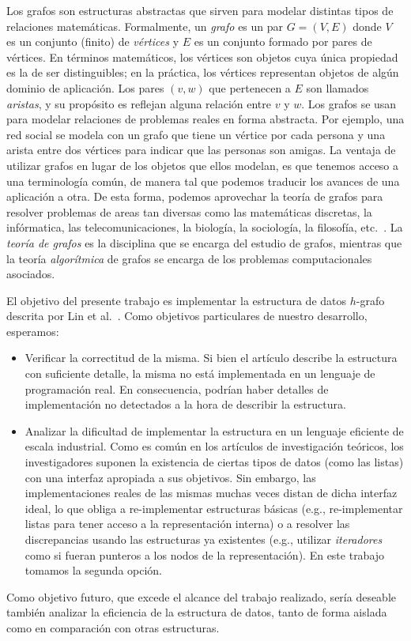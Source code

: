 \documentclass[%
    a4paper,%
    fontsize=12pt,%
    DIV=12,
    twoside,%
    openright,%
    titlepage=true,%
    headsepline,%
    toc=bibliography,%
    parskip=half,%
    cleardoublepage=empty,%
    headings=big,%
]{scrbook}
\begin{document}
Los grafos son estructuras abstractas que sirven para modelar distintas tipos de relaciones matemáticas.  Formalmente, un \emph{grafo} es un par $G = (V, E)$ donde $V$ es un conjunto (finito) de \emph{vértices} y $E$ es un conjunto formado por pares de vértices.  En términos matemáticos, los vértices son objetos cuya única propiedad es la de ser distinguibles; en la práctica, los vértices representan objetos de algún dominio de aplicación.  Los pares $(v,w)$ que pertenecen a $E$ son llamados \emph{aristas}, y su propósito es reflejan alguna relación entre $v$ y $w$.  Los grafos se usan para modelar relaciones de problemas reales en forma abstracta.  Por ejemplo, una red social se modela con un grafo que tiene un vértice por cada persona y una arista entre dos vértices para indicar que las personas son amigas.  La ventaja de utilizar grafos en lugar de los objetos que ellos modelan, es que tenemos acceso a una terminología común, de manera tal que podemos traducir los avances de una aplicación a otra.  De esta forma, podemos aprovechar la teoría de grafos para resolver problemas de areas tan diversas como las matemáticas discretas, la infórmatica, las telecomunicaciones, la biología, la sociología, la filosofía, etc.~\cite{GrossYellen2006}.  La \emph{teoría de grafos} es la disciplina que se encarga del estudio de grafos, mientras que la teoría \emph{algorítmica} de grafos se encarga de los problemas computacionales asociados.

El objetivo del presente trabajo es implementar la estructura de datos $h$-grafo descrita por Lin et al.~\cite{LinSoulignacSzwarcfiterTCS2012}.   Como objetivos particulares de nuestro desarrollo, esperamos:
\begin{itemize}
  \item Verificar la correctitud de la misma.  Si bien el artículo describe la estructura con suficiente detalle, la misma no está implementada en un lenguaje de programación real.  En consecuencia, podrían haber detalles de implementación no detectados a la hora de describir la estructura.
  \item Analizar la dificultad de implementar la estructura en un lenguaje eficiente de escala industrial.  Como es común en los artículos de investigación teóricos, los investigadores suponen la existencia de ciertas tipos de datos (como las listas) con una interfaz apropiada a sus objetivos.  Sin embargo, las implementaciones reales de las mismas muchas veces distan de dicha interfaz ideal, lo que obliga a re-implementar estructuras básicas (e.g., re-implementar listas para tener acceso a la representación interna) o a resolver las discrepancias usando las estructuras ya existentes (e.g., utilizar \emph{iteradores} como si fueran punteros a los nodos de la representación).  En este trabajo tomamos la segunda opción.
\end{itemize}
Como objetivo futuro, que excede el alcance del trabajo realizado, sería deseable también analizar la eficiencia de la estructura de datos, tanto de forma aislada como en comparación con otras estructuras.
\end{document}
